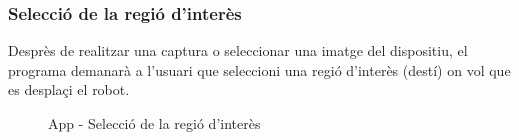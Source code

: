 	\subsubsection{Selecció de la regió d'interès}
		Desprès de realitzar una captura o seleccionar una imatge del dispositiu, el programa demanarà a l'usuari que seleccioni una regió d'interès (destí) on vol que es desplaçi el robot.
		\begin{figure}[H]
			\begin{minipage}{6in}
				\centering
				\hspace*{.2in}
			\end{minipage}
			\caption{App - Selecció de la regió d'interès}
		\end{figure}
